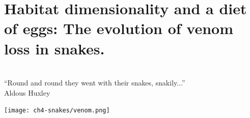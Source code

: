 \chapter[Evolution of venom loss in snakes]{Habitat dimensionality and a diet of eggs: The evolution of venom loss in snakes.}
\label{chap:Snake}












    \begin{minipage}{0.45\textwidth}
      \centering
      {~\\
      ``Round and round they went with their snakes, snakily...''\\
  {Aldous Huxley}}
    \end{minipage}%
    \begin{minipage}{0.5\textwidth}
            \texttt{[image: ch4-snakes/venom.png]}
    \end{minipage}






